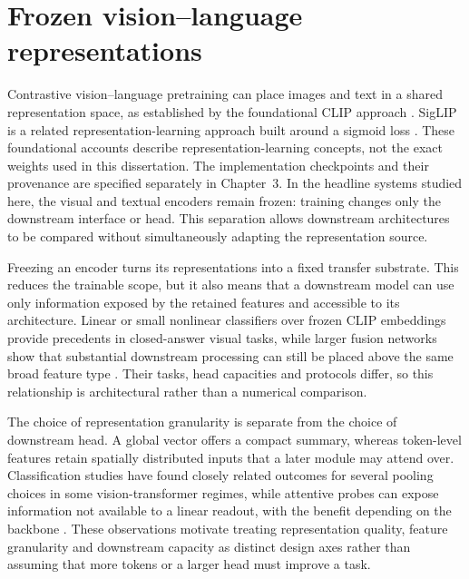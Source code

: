\section{Frozen vision--language representations}
\label{sec:ch2-representations}

\begingroup
\sloppy
Contrastive vision--language pretraining can place images and text in a shared representation space, as established by the foundational CLIP approach \citep{radford2021clip}.
SigLIP is a related representation-learning approach built around a sigmoid loss \citep{zhai2023siglip}.
These foundational accounts describe representation-learning concepts, not the exact weights used in this dissertation. The implementation checkpoints and their provenance are specified separately in Chapter~3. In the headline systems studied here, the visual and textual encoders remain frozen: training changes only the downstream interface or head. This separation allows downstream architectures to be compared without simultaneously adapting the representation source.
\par\endgroup

Freezing an encoder turns its representations into a fixed transfer substrate. This reduces the trainable scope, but it also means that a downstream model can use only information exposed by the retained features and accessible to its architecture. Linear or small nonlinear classifiers over frozen CLIP embeddings provide precedents in closed-answer visual tasks, while larger fusion networks show that substantial downstream processing can still be placed above the same broad feature type \citep{deuser2022less,bourigault2025frevl}. Their tasks, head capacities and protocols differ, so this relationship is architectural rather than a numerical comparison.

The choice of representation granularity is separate from the choice of downstream head. A global vector offers a compact summary, whereas token-level features retain spatially distributed inputs that a later module may attend over. Classification studies have found closely related outcomes for several pooling choices in some vision-transformer regimes, while attentive probes can expose information not available to a linear readout, with the benefit depending on the backbone \citep{zhai2022scaling,psomas2026ep}. These observations motivate treating representation quality, feature granularity and downstream capacity as distinct design axes rather than assuming that more tokens or a larger head must improve a task.

